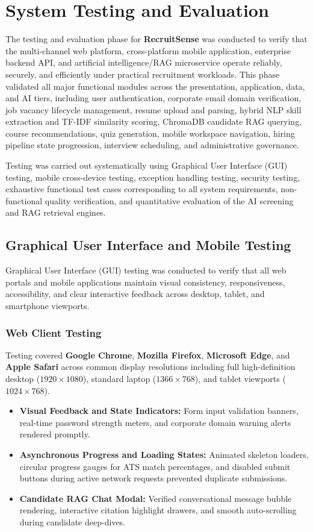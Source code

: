 \chapter{System Testing and Evaluation}\label{chap:testingEvaluation}

The testing and evaluation phase for \textbf{RecruitSense} was conducted to verify that the multi-channel web platform, cross-platform mobile application, enterprise backend API, and artificial intelligence/RAG microservice operate reliably, securely, and efficiently under practical recruitment workloads. This phase validated all major functional modules across the presentation, application, data, and AI tiers, including user authentication, corporate email domain verification, job vacancy lifecycle management, resume upload and parsing, hybrid NLP skill extraction and TF-IDF similarity scoring, ChromaDB candidate RAG querying, course recommendations, quiz generation, mobile workspace navigation, hiring pipeline state progression, interview scheduling, and administrative governance.

Testing was carried out systematically using Graphical User Interface (GUI) testing, mobile cross-device testing, exception handling testing, security testing, exhaustive functional test cases corresponding to all system requirements, non-functional quality verification, and quantitative evaluation of the AI screening and RAG retrieval engines.

\section{Graphical User Interface and Mobile Testing}
Graphical User Interface (GUI) testing was conducted to verify that all web portals and mobile applications maintain visual consistency, responsiveness, accessibility, and clear interactive feedback across desktop, tablet, and smartphone viewports.

\subsection{Web Client Testing}
Testing covered \textbf{Google Chrome}, \textbf{Mozilla Firefox}, \textbf{Microsoft Edge}, and \textbf{Apple Safari} across common display resolutions including full high-definition desktop ($1920\times1080$), standard laptop ($1366\times768$), and tablet viewports ($1024\times768$).
\begin{itemize}
    \item \textbf{Visual Feedback and State Indicators:} Form input validation banners, real-time password strength meters, and corporate domain warning alerts rendered promptly.
    \item \textbf{Asynchronous Progress and Loading States:} Animated skeleton loaders, circular progress gauges for ATS match percentages, and disabled submit buttons during active network requests prevented duplicate submissions.
    \item \textbf{Candidate RAG Chat Modal:} Verified conversational message bubble rendering, interactive citation highlight drawers, and smooth auto-scrolling during candidate deep-dives.
\end{itemize}

